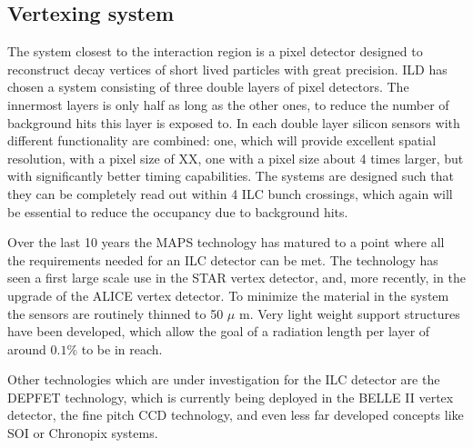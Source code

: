 \documentclass[%
 amsmath,amssymb,
 aps,
]{revtex4-1}
\begin{document}
\subsection{Vertexing system}
The system closest to the interaction region is a pixel detector designed to reconstruct decay vertices of short lived particles with great precision. ILD has chosen a system consisting of three double layers of pixel detectors. The innermost layers is only half as long as the other ones, to reduce the number of background hits this layer is exposed to. In each double layer silicon sensors with different functionality are combined: one, which will provide excellent spatial resolution, with a pixel size of XX, one with a pixel size about 4 times larger, but with significantly better timing capabilities. The systems are designed such that they can be completely read out within 4 ILC bunch crossings, which again will be essential to reduce the occupancy due to background hits. 

Over the last 10 years the MAPS technology has matured to a point where all the requirements needed for an ILC detector can be met. The technology has seen a first large scale use in the STAR vertex detector, and, more recently, in the upgrade of the ALICE vertex detector. To minimize the material in the system the sensors are routinely thinned to 50 $\mu$ m. Very light weight support structures have been developed, which allow the goal of a radiation length per layer of around $0.1 \%$ to be in reach. 

Other technologies which are under investigation for the ILC detector are the DEPFET technology, which is currently being deployed in the BELLE II vertex detector, the fine pitch CCD technology, and even less far developed concepts like SOI or Chronopix systems. 
\end{document}
